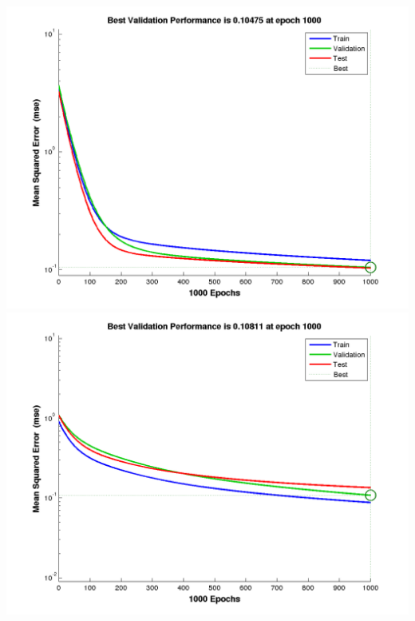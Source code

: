 \documentclass[a4paper]{article}
\begin{document}
\includegraphics[width=\textwidth]{tr4.png}
\includegraphics[width=\textwidth]{tr5.png}
\end{document}
